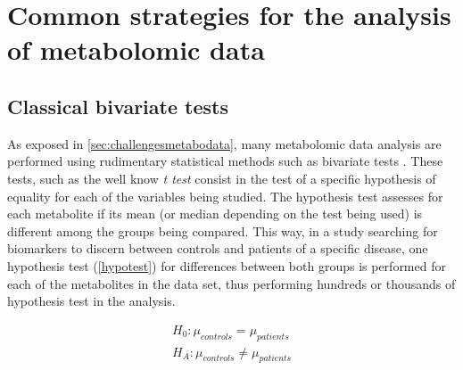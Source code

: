 
\chapter[Common strategies for the analysis of metabolomic data]{Common strategies for the analysis of metabolomic data}



\section{Classical bivariate tests}
\label{bivariate_tests}
As exposed in \autoref{sec:challengesmetabodata}, many metabolomic data analysis are performed using rudimentary statistical methods such as bivariate tests \parencite{saccenti2014reflections}. These tests, such as the well know \textit{t test} consist in the test of a specific hypothesis of equality for each of the variables being studied. The hypothesis test assesses for each metabolite if its mean (or median depending on the test being used) is different among the groups being compared. This way, in a study searching for biomarkers to discern between controls and patients of a specific disease, one hypothesis test (\autoref{hypotest}) for differences between both groups is performed for each of the metabolites in the data set, thus performing hundreds or thousands of hypothesis test in the analysis.

\begin{equation}
\label{hypotest}
\begin{split}
H_0: \mu_{controls} = \mu_{patients} \\
H_A: \mu_{controls} \neq \mu_{patients}
\end{split}
\end{equation}

